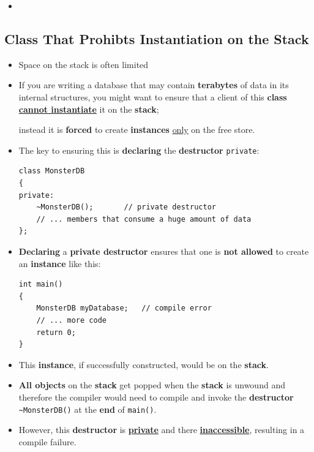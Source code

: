 \documentclass[10pt]{article}
\newcommand{\pbreak}{\vspace{30pt}}
\begin{document}
\pbreak
\begin{itemize}
	\item {}
\end{itemize}

\newpage
\subsection{Class That Prohibts Instantiation on the Stack}
\begin{itemize}
	\item Space on the stack is often limited
	\item If you are writing a database that may contain \textbf{terabytes} of data in its internal structures, you might want to ensure that a client of this \textbf{class} \underline{\textbf{cannot instantiate}} it on the \textbf{stack};

		instead it is \textbf{forced} to create \textbf{instances} \underline{only} on the free store.

	\item The key to ensuring this is \textbf{declaring} the \textbf{destructor} \verb|private|:

		\begin{verbatim}
class MonsterDB
{
private:
	~MonsterDB();		// private destructor
	// ... members that consume a huge amount of data
};
		\end{verbatim}

	\item \textbf{Declaring} a \textbf{private destructor} ensures that one is \textbf{not allowed} to create an \textbf{instance} like this:
	\begin{verbatim}
int main()
{
	MonsterDB myDatabase;	// compile error
	// ... more code
	return 0;
}
	\end{verbatim}

	\item This \textbf{instance}, if successfully constructed, would be on the \textbf{stack}.
	\item \textbf{All objects} on the \textbf{stack} get popped when the \textbf{stack} is unwound and therefore the compiler would need to compile and invoke the \textbf{destructor} \verb|~MonsterDB()| at the \textbf{end} of \verb|main()|.

	\item However, this \textbf{destructor} is \textbf{\underline{private}} and there \underline{\textbf{inaccessible}}, resulting in a compile failure.


\end{itemize}
\end{document}
